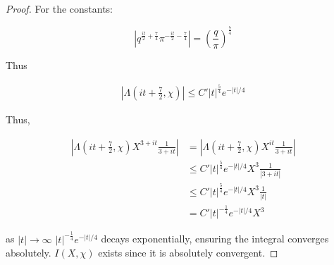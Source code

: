 \documentclass{article}
\newcommand{\abs}[1]{\left\lvert #1\right\rvert}
\begin{document}
\begin{proof}
    For the constants:
    
    \[\abs{q^{\frac{it}{2} + \frac{7}{4}} \pi^{-\frac{it}{2} - \frac{7}{4}}} = \left(\frac{q}{\pi}\right)^{\frac{7}{4}}\]

    Thus 

    \begin{align*}
        \abs{\Lambda(it + \frac{7}{2}, \chi)} \leq C' \abs{t}^{\frac{5}{4}} e^{-\abs{t}/4}
    \end{align*}

    Thus,

    \begin{align*}
        \abs{\Lambda(it + \frac{7}{2}, \chi) X^{3 + it} \frac{1}{3 + it}} &= \abs{\Lambda(it + \frac{7}{2}, \chi) X^{it} \frac{1}{3 + it}} \\
        &\leq C' \abs{t}^{\frac{5}{4}}e^{-\abs{t}/4} X^{3} \frac{1}{\abs{3 + it}} \\
        &\leq C' \abs{t}^{\frac{5}{4}}e^{-\abs{t}/4} X^{3} \frac{1}{\abs{t}} \\
        &= C' \abs{t}^{-\frac{1}{4}} e^{-\abs{t}/4} X^3
    \end{align*}

    as $\abs{t} \to \infty$ $\abs{t}^{-\frac{1}{4}} e^{-\abs{t}/4}$ decays exponentially, ensuring the integral converges absolutely. $I(X, \chi)$ exists since it is absolutely convergent.   
\end{proof}
\bigskip
\end{document}
